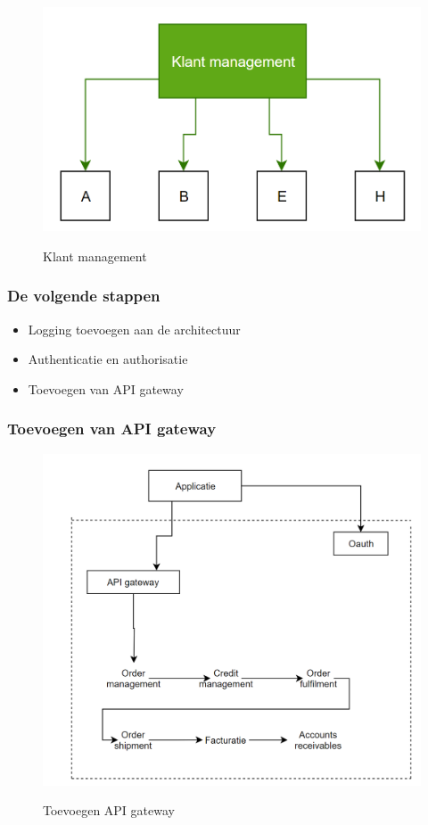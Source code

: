 \documentclass[aspectratio=169]{beamer}
\begin{document}
\begin{frame}
\begin{figure}
	\caption{Klant management}
	\includegraphics[height=.8\textheight]{img/klantmanagement.png}
	\label{img:klant_management}
\end{figure}
\end{frame}

\begin{frame}
	\frametitle{De volgende stappen}
	\begin{itemize}
		\item Logging toevoegen aan de architectuur
		\item Authenticatie en authorisatie
		\item Toevoegen van API gateway
	\end{itemize}
\end{frame}

\begin{frame}
	\frametitle{Toevoegen van API gateway}
	\begin{figure}
		\caption{Toevoegen API gateway}
		\includegraphics[height=.8\textheight]{img/apiSchema.png}
		\label{img:api_schema}
	\end{figure}
\end{frame}
\end{document}
